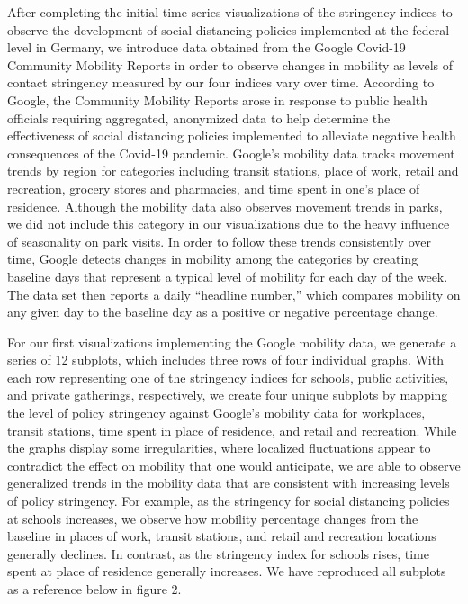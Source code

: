 After completing the initial time series visualizations of the stringency indices to observe the development of social distancing policies implemented at the federal level in Germany, we introduce data obtained from the Google Covid-19 Community Mobility Reports in order to observe changes in mobility as levels of contact stringency measured by our four indices vary over time. According to Google, the Community Mobility Reports arose in response to public health officials requiring aggregated, anonymized data to help determine the effectiveness of social distancing policies implemented to alleviate negative health consequences of the Covid-19 pandemic. Google’s mobility data tracks movement trends by region for categories including transit stations, place of work, retail and recreation, grocery stores and pharmacies, and time spent in one’s place of residence. Although the mobility data also observes movement trends in parks, we did not include this category in our visualizations due to the heavy influence of seasonality on park visits. In order to follow these trends consistently over time, Google detects changes in mobility among the categories by creating baseline days that represent a typical level of mobility for each day of the week. The data set then reports a daily “headline number,” which compares mobility on any given day to the baseline day as a positive or negative percentage change.

For our first visualizations implementing the Google mobility data, we generate a series of 12 subplots, which includes three rows of four individual graphs. With each row representing one of the stringency indices for schools, public activities, and private gatherings, respectively, we create four unique subplots by mapping the level of policy stringency against Google’s mobility data for workplaces, transit stations, time spent in place of residence, and retail and recreation. While the graphs display some irregularities, where localized fluctuations appear to contradict the effect on mobility that one would anticipate, we are able to observe generalized trends in the mobility data that are consistent with increasing levels of policy stringency. For example, as the stringency for social distancing policies at schools increases, we observe how mobility percentage changes from the baseline in places of work, transit stations, and retail and recreation locations generally declines. In contrast, as the stringency index for schools rises, time spent at place of residence generally increases. We have reproduced all subplots as a reference below in figure 2.

